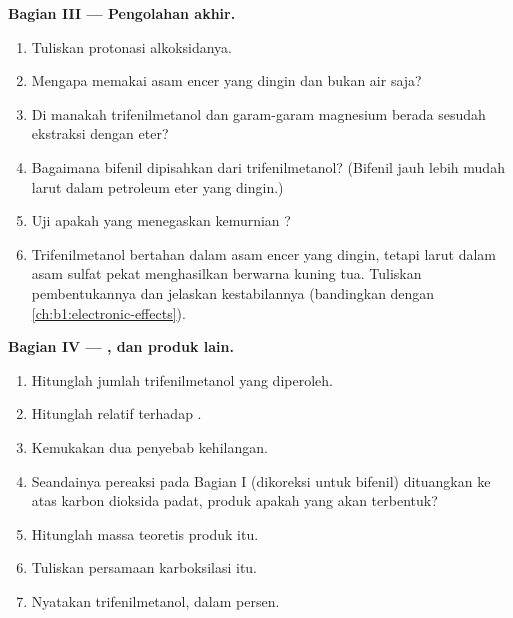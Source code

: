 \begin{problem}
\medskip
\noindent\textbf{Bagian III --- Pengolahan akhir.}
\begin{enumerate}[resume]
  \item Tuliskan protonasi alkoksidanya.
  \item Mengapa memakai asam encer yang dingin dan bukan air saja?
  \item Di manakah trifenilmetanol dan garam-garam magnesium berada
        sesudah ekstraksi dengan eter?
  \item Bagaimana bifenil dipisahkan dari trifenilmetanol? (Bifenil jauh
        lebih mudah larut dalam petroleum eter yang dingin.)
  \item Uji apakah yang menegaskan kemurnian ?
  \item Trifenilmetanol bertahan dalam asam encer yang dingin, tetapi
        larut dalam asam sulfat pekat menghasilkan  berwarna
        kuning tua. Tuliskan pembentukannya dan jelaskan kestabilannya
        (bandingkan dengan \cref{ch:b1:electronic-effects}).
\end{enumerate}

\medskip
\noindent\textbf{Bagian IV --- , dan produk lain.}
\begin{enumerate}[resume]
  \item Hitunglah jumlah trifenilmetanol yang diperoleh.
  \item Hitunglah  relatif terhadap .
  \item Kemukakan dua penyebab kehilangan.
  \item Seandainya pereaksi pada Bagian I (dikoreksi untuk bifenil)
        dituangkan ke atas karbon dioksida padat, produk apakah yang akan
        terbentuk?
  \item Hitunglah massa teoretis produk itu.
  \item Tuliskan persamaan karboksilasi itu.
  \item Nyatakan  trifenilmetanol, dalam persen.
\end{enumerate}
\end{problem}
